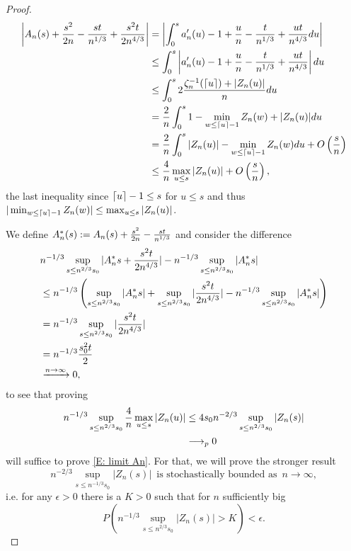 \begin{proof}
    \begin{align*}
    \left| A_n(s) + \frac{s^2}{2n} - \frac{st}{n^{1 / 3}}  + \frac{s^2t}{2n^{4 / 3}}  \right| 
    &= \left| \int_{0}^{s} a'_n(u) - 1 + \frac{u}{n} - \frac{t}{n^{1 / 3}} + \frac{ut}{n^{4 / 3}} du \right| \\
    &\leq \int_{0}^{s} \left|a'_n(u) - 1 + \frac{u}{n} - \frac{t}{n^{1 / 3}} + \frac{ut}{n^{4 / 3}} \right| du \\
    &\leq \int_{0}^{s} 2 \frac{\zeta^{-1}_n(\lceil u\rceil) + |Z_n(u)|}{n} du \\
    &= \frac{2}{n}  \int_{0}^{s} 1-\min_{w \leq \lceil u\rceil-1} Z_n(w)  + |Z_n(u)| du \\
    &= \frac{2}{n}  \int_{0}^{s} |Z_n(u)| - \min_{w \leq \lceil u\rceil-1} Z_n(w) du + O\left(\frac{s}{n}\right) \\
    &\leq \frac{4}{n} \max_{u \leq s} |Z_n(u)| + O\left(\frac{s}{n}\right),
    \end{align*}
    the last inequality since $\lceil u\rceil-1 \leq s$ for $u\leq s$ and thus $|\min_{w \leq \lceil u\rceil-1}Z_n(w)| \leq \max_{u \leq s}|Z_n(u)|$.
    
    We define $A^*_n(s) := A_n(s) + \frac{s^2}{2n} - \frac{st}{n^{1 / 3}}$ and consider the difference
    \begin{align*}
    &n^{-1 / 3}\sup_{s \leq n^{2 / 3} s_0 } | A^*_n{s} + \frac{s^2t}{2n^{4 / 3}}  | - n^{-1 / 3}\sup_{s \leq n^{2 / 3} s_0 } | A^*_n{s} | \\
    &\leq n^{-1 / 3} \left( \sup_{s \leq n^{2 / 3} s_0 } | A^*_n{s} | + \sup_{s \leq n^{2 / 3} s_0 } |\frac{s^2t}{2n^{4 / 3}}|  - n^{-1 / 3}\sup_{s \leq n^{2 / 3} s_0 } | A^*_n{s} | \right) \\
    &= n^{-1 / 3} \sup_{s \leq n^{2 / 3} s_0 } |\frac{s^2t}{2n^{4 / 3}}| \\
    &= n^{-1 / 3} \frac{s_0^2t}{2} \\
    &\xrightarrow{n \rightarrow \infty} 0,
    \end{align*}
    to see that proving
    \begin{align*}
    n^{-1 / 3} \sup_{s \leq n^{2 / 3} s_0 } \frac{4}{n} \max_{u \leq s} |Z_n(u)| 
    &\leq 4 s_0 n^{-2 / 3} \sup_{s \leq n^{2 / 3} s_0 } |Z_n(s)| \\
    &\longrightarrow_p 0 
    \end{align*}
    will suffice to prove \ref{E: limit An}.
    For that, we will prove the stronger result 
    \begin{equation}
    n^{-2/3} \sup_{s\leq n^{-1/3} s_0} |Z_n(s)| 
    \enspace \text{is stochastically bounded as} \enspace n \rightarrow \infty ,
    \end{equation} 
    i.e. for any 
    $ \epsilon > 0 $ 
    there is a
    $ K > 0 $
    such that for $n$ sufficiently big 
    \begin{equation} \label{E: stoch bounded}
    P\left( n^{-1/3} \sup_{s\leq n^{2/3} s_0} |Z_n(s)| > K \right) < \epsilon. 
    \end{equation}
    

\end{proof}
